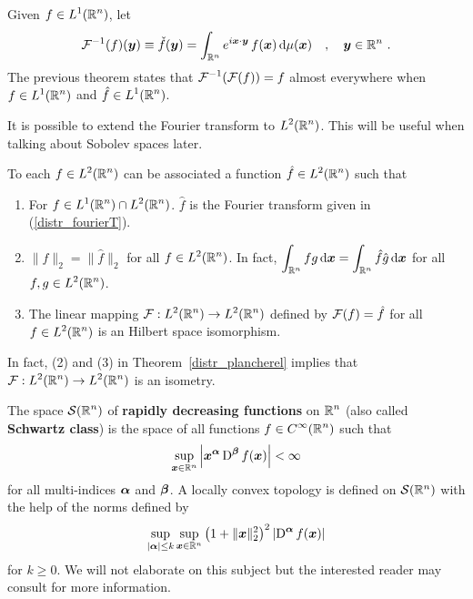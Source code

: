 Given $\displaystyle f\in L^1(\mathbb{R}^n)$, let
\[
\mathcal{F}^{-1}(f)({\bm{y}}) \equiv \check{f}({\bm{y}}) = 
\int_{\mathbb{R}^n} e^{i {\bm{x}}\cdot{\bm{y}}} \, f({\bm{x}}) \,\mathrm{d}{\mu({\bm{x}})}
\quad , \quad {\bm{y}} \in \mathbb{R}^n \ .
\]
The previous theorem states that $\displaystyle \mathcal{F}^{-1}(\mathcal{F}(f)) = f$
almost everywhere when $\displaystyle f \in L^1(\mathbb{R}^n)$
and $\displaystyle \hat{f} \in L^1(\mathbb{R}^n)$.

It is possible to extend the Fourier transform to $\displaystyle L^2(\mathbb{R}^n)$.
This will be useful when talking about Sobolev spaces later.

\begin{theorem}[Plancherel] \label{distr_plancherel}
To each $\displaystyle f\in L^2(\mathbb{R}^n)$ can be associated a function
$\displaystyle \hat{f} \in L^2(\mathbb{R}^n)$ such that   
\begin{enumerate}
\item For $\displaystyle f \in L^1(\mathbb{R}^n) \cap L^2(\mathbb{R}^n)$. $\hat{f}$ is the
Fourier transform given in (\ref{distr_fourierT}).
\item $\| f \|_2 = \|\hat{f}\|_2$ for all $\displaystyle f \in L^2(\mathbb{R}^n)$.
In fact, $\displaystyle \int_{\mathbb{R}^n} f g \,\mathrm{d}{{\bm{x}}} =
\int_{\mathbb{R}^n} \hat{f} \hat{g} \,\mathrm{d}{{\bm{x}}}$ for all
$\displaystyle f,g \in L^2(\mathbb{R}^n)$.
\item The linear mapping $\displaystyle \mathcal{F}: L^2(\mathbb{R}^n) \rightarrow L^2(\mathbb{R}^n)$
defined by $\mathcal{F}(f) = \hat{f}$ for all $\displaystyle f \in L^2(\mathbb{R}^n)$
is an Hilbert space isomorphism.
\end{enumerate}
\end{theorem}

In fact, (2) and (3) in Theorem~\ref{distr_plancherel} implies that 
$\displaystyle \mathcal{F}: L^2(\mathbb{R}^n) \rightarrow L^2(\mathbb{R}^n)$ is an isometry.

The space $\displaystyle \mathcal{S}(\mathbb{R}^n)$ of
{\bfseries rapidly decreasing functions} on $\displaystyle \mathbb{R}^n$ (also called 
{\bfseries Schwartz class}) is the space of all
functions $\displaystyle f \in C^\infty(\mathbb{R}^n)$ such that
\[
\sup_{{\bm{x}} \in \mathbb{R}^n} \left| {\bm{x}}^{{\bm{\alpha}}}
\operatorname{D}^{{\bm{\beta}}} f({\bm{x}}) \right| < \infty
\]
for all multi-indices ${\bm{\alpha}}$ and ${\bm{\beta}}$.  A locally
convex topology is defined on $\mathcal{S}(\mathbb{R}^n)$ with the help of the norms
defined by
\[
\sup_{|{\bm{\alpha}}|\leq k} \sup_{{\bm{x}} \in \mathbb{R}^n}
\left( 1 + \|{\bm{x}}\|_2^2\right)^2
\left| \operatorname{D}^{{\bm{\alpha}}} f({\bm{x}}) \right|
\]
for $k \geq 0$.  We will not elaborate on this subject but the
interested reader may consult \cite{RuFA,ReeSim} for more information.


